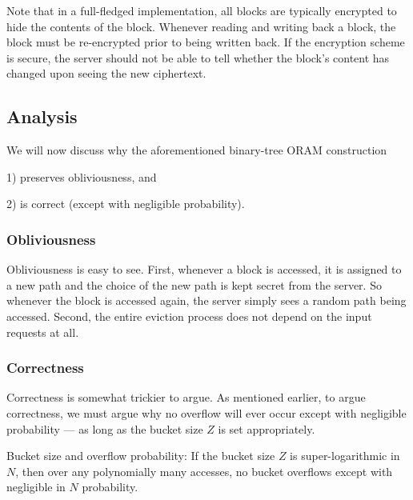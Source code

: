 \begin{remark}
Note that in a full-fledged implementation, 
all blocks are typically encrypted to hide the contents of the block.
Whenever reading and writing back a block, the block
must be re-encrypted prior to being written back.
If the encryption scheme is secure, the server should not be able
to tell whether the block's content has changed 
upon seeing the new ciphertext.
\end{remark}

\subsection{Analysis}\label{analysis}

We will now discuss why the aforementioned binary-tree ORAM construction

1) preserves obliviousness, and

2) is correct (except with negligible probability).

\subsubsection{Obliviousness}\label{obliviousness.}

Obliviousness is easy to see.
First, whenever a block is accessed, it is assigned to a new path and
the choice of the new path is kept secret from the server. So whenever
the block is accessed again, the server simply sees a random path being
accessed.
Second, the entire eviction process does not depend on the input
requests at all.

\subsubsection{Correctness}\label{correctness.}

Correctness is somewhat trickier to argue. As mentioned earlier, to
argue correctness, we must argue why no overflow will ever occur except
with negligible probability --- as long as the bucket size \(Z\) is set
appropriately.

\begin{claim}
\label{clm:bucketsize}
Bucket size and overflow probability: If the bucket size \(Z\) is
super-logarithmic in \(N\), then over any polynomially many accesses, no
bucket overflows except with negligible in \(N\) probability.
\end{claim}

